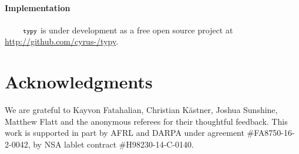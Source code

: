 \documentclass[10pt]{sigplanconf}
\newcommand{\typy}{\texttt{\footnotesize typy}}
\newcommand{\lip}[1]{\lstinline[language=Python,basicstyle=\ttfamily\footnotesize,morekeywords={with},deletendkeywords={tuple,buffer,map}]{#1}}
\begin{document}

\paragraph{Implementation}
$\typy$ is under development as a free open source project at 
\url{http://github.com/cyrus-/typy}.

\clearpage
\section*{Acknowledgments}
We are grateful to Kayvon Fatahalian, Christian K\"astner, Joshua Sunshine, Matthew Flatt and the anonymous referees for their thoughtful feedback. This work is supported in part by AFRL and DARPA under agreement \#FA8750-16-2-0042, by NSA lablet contract \#H98230-14-C-0140. 







\end{document}
